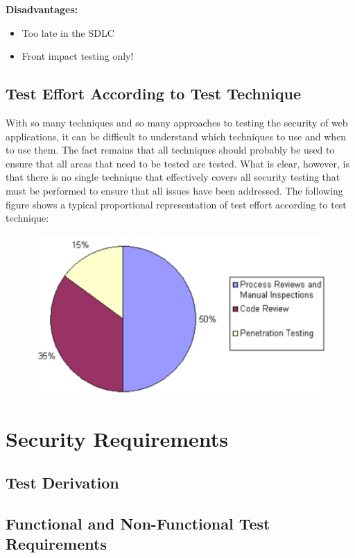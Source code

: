 		{\bf Disadvantages:}
		\begin{itemize}
			\item Too late in the SDLC
			\item Front impact testing only!
		\end{itemize}

		\clearpage
		\subsection{Test Effort According to Test Technique}
			With so many techniques and so many approaches to testing the security of web
			applications, it can be difficult to understand which techniques to use and when 
			to use them. The fact remains that all techniques should probably be used to 
			ensure that all areas that need to be tested are tested. What is clear, however, 
			is that there is no single technique that effectively covers all security testing 
			that must be performed to ensure that all issues have been addressed. The following
			figure shows a typical proportional representation of test effort according to 
			test technique:

			\begin{figure}[H]
				\centering
				\includegraphics[scale=0.6]{pics/effort.png}
			\end{figure}

	\clearpage
	\section{Security Requirements}

		\subsection{Test Derivation}

		\subsection{Functional and Non-Functional Test Requirements}

